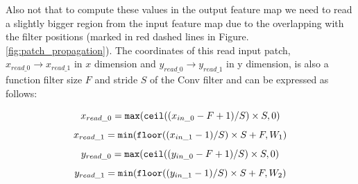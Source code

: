 \vspace{0.2in}

Also not that to compute these values in the output feature map we need to read a slightly bigger region from the input feature map due to the overlapping with the filter positions (marked in red dashed lines in Figure. \ref{fig:patch_propagation}). The coordinates of this read input patch, $x_{read\_0}\rightarrow x_{read\_1}$ in $x$ dimension and $y_{read\_0}\rightarrow y_{read\_1}$ in y dimension, is also a function filter size $F$ and stride $S$ of the Conv filter and can be expressed as follows:

\begin{equation}
x_{read\_0} = \texttt{max}(\texttt{ceil}((x_{in\_0} - F + 1)/S) \times S, 0) \\
\end{equation}
\begin{equation}
x_{read\_1} = \texttt{min}(\texttt{floor}((x_{in\_1} - 1)/S) \times S + F, W_1)\\
\end{equation}
\begin{equation}
y_{read\_0} = \texttt{max}(\texttt{ceil}((y_{in\_0} - F + 1)/S) \times S, 0) \\
\end{equation}
\begin{equation}
y_{read\_1} = \texttt{min}(\texttt{floor}((y_{in\_1} - 1)/S) \times S + F, W_2)\\
\end{equation}

\vspace{0.2in}

